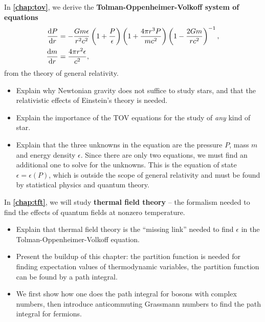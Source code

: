 In \textbf{\cref{chap:tov}}, we derive the \textbf{Tolman-Oppenheimer-Volkoff system of equations}
\begin{align*}
	\odv{P}{r} &= -\frac{G m \epsilon}{r^2 c^2} \left( 1 + \frac{P}{\epsilon} \right) \left( 1 + \frac{4 \pi r^3 P}{m c^2} \right) \left( 1 - \frac{2 G m}{r c^2} \right)^{-1} , \\
	\odv{m}{r} &= \frac{4 \pi r^2 \epsilon}{c^2} ,
\end{align*}
from the theory of general relativity.
\begin{itemize}
\item Explain why Newtonian gravity does not suffice to study stars, and that the relativistic effects of Einstein's theory is needed.
\item Explain the importance of the TOV equations for the study of \emph{any} kind of star.
\item Explain that the three unknowns in the equation are the pressure $P$, mass $m$ and energy density $\epsilon$.
      Since there are only two equations, we must find an additional one to solve for the unknowns.
      This is the equation of state $\epsilon = \epsilon(P)$, which is outside the scope of general relativity and must be found by statistical physics and quantum theory.
\end{itemize}

In \textbf{\cref{chap:tft}}, we will study \textbf{thermal field theory} -- the formalism needed to find the effects of quantum fields at nonzero temperature.
\begin{itemize}
\item Explain that thermal field theory is the ``missing link'' needed to find $\epsilon$ in the Tolman-Oppenheimer-Volkoff equation.
\item Present the buildup of this chapter: the partition function is needed for finding expectation values of thermodynamic variables, the partition function can be found by a path integral.
\item We first show how one does the path integral for bosons with complex numbers, then introduce anticommuting Grassmann numbers to find the path integral for fermions.
\end{itemize}

